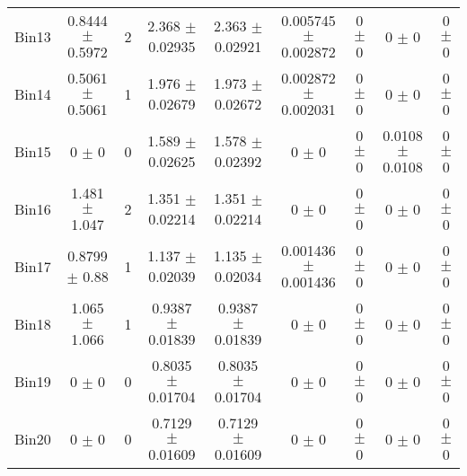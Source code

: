 \begin{tabular}{@{\extracolsep{4pt}}lcccccccc@{}}
     Bin13 & 0.8444 $\pm$ 0.5972 & 2 & 2.368 $\pm$ 0.02935 & 2.363 $\pm$ 0.02921 & 0.005745 $\pm$ 0.002872 & 0 $\pm$ 0 & 0 $\pm$ 0 & 0 $\pm$ 0 \\ 
     Bin14 & 0.5061 $\pm$ 0.5061 & 1 & 1.976 $\pm$ 0.02679 & 1.973 $\pm$ 0.02672 & 0.002872 $\pm$ 0.002031 & 0 $\pm$ 0 & 0 $\pm$ 0 & 0 $\pm$ 0 \\ 
     Bin15 & 0 $\pm$ 0 & 0 & 1.589 $\pm$ 0.02625 & 1.578 $\pm$ 0.02392 & 0 $\pm$ 0 & 0 $\pm$ 0 & 0.0108 $\pm$ 0.0108 & 0 $\pm$ 0 \\ 
     Bin16 & 1.481 $\pm$ 1.047 & 2 & 1.351 $\pm$ 0.02214 & 1.351 $\pm$ 0.02214 & 0 $\pm$ 0 & 0 $\pm$ 0 & 0 $\pm$ 0 & 0 $\pm$ 0 \\ 
     Bin17 & 0.8799 $\pm$ 0.88 & 1 & 1.137 $\pm$ 0.02039 & 1.135 $\pm$ 0.02034 & 0.001436 $\pm$ 0.001436 & 0 $\pm$ 0 & 0 $\pm$ 0 & 0 $\pm$ 0 \\ 
     Bin18 & 1.065 $\pm$ 1.066 & 1 & 0.9387 $\pm$ 0.01839 & 0.9387 $\pm$ 0.01839 & 0 $\pm$ 0 & 0 $\pm$ 0 & 0 $\pm$ 0 & 0 $\pm$ 0 \\ 
     Bin19 & 0 $\pm$ 0 & 0 & 0.8035 $\pm$ 0.01704 & 0.8035 $\pm$ 0.01704 & 0 $\pm$ 0 & 0 $\pm$ 0 & 0 $\pm$ 0 & 0 $\pm$ 0 \\ 
     Bin20 & 0 $\pm$ 0 & 0 & 0.7129 $\pm$ 0.01609 & 0.7129 $\pm$ 0.01609 & 0 $\pm$ 0 & 0 $\pm$ 0 & 0 $\pm$ 0 & 0 $\pm$ 0 \\ 
\hline\hline
  \end{tabular}
